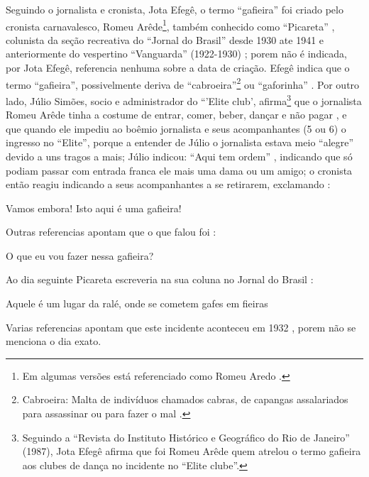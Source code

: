 Seguindo o jornalista e cronista, Jota Efegê, %
o termo ``gafieira'' foi criado pelo cronista carnavalesco, 
Romeu Arêde\footnote{Em algumas versões está  referenciado como Romeu Aredo \cite[pp. 188]{raca1999}.}, 
também conhecido como ``Picareta'' \cite[pp. 29]{instituto1987revista}\cite[pp. 3 - cad. 3]{juliosimoes} 
\cite[pp. 21]{efege1974maxixe} \cite[pp. 78]{coutinho2006cronistas}, 
colunista da seção recreativa do ``Jornal do Brasil'' desde 1930 ate 1941
e anteriormente do vespertino ``Vanguarda'' (1922-1930) \cite[pp. 58-59]{efege1982figuras} 
\cite[pp. 6 - cad. B]{entrevistajuliojournalbrasil1};
porem não é indicada, por Jota Efegê, referencia nenhuma sobre a data de criação.
Efegê indica que o termo ``gafieira'', possivelmente deriva de 
``cabroeira''\footnote{Cabroeira: Malta de indivíduos chamados cabras, 
de capangas assalariados para assassinar ou para fazer o mal \cite{diciocabroeira}.} 
ou ``gaforinha'' \cite[pp. 3 - cad. 3]{juliosimoes}.
Por outro lado, Júlio Simões, socio e administrador do ``'Elite club', 
afirma\footnote{Seguindo a ``Revista do Instituto Histórico e Geográfico do Rio de Janeiro'' (1987),
Jota Efegê afirma que foi Romeu Arêde quem atrelou o termo gafieira aos clubes de dança no incidente no ``Elite clube''.} 
que o jornalista Romeu Arêde tinha a costume de entrar, 
comer, beber, dançar e não pagar \cite[pp.13 ]{respeitojournalbrasil1},
e que quando ele impediu ao boêmio jornalista e seus acompanhantes (5 ou 6) o ingresso no ``Elite'', 
porque a entender de Júlio o jornalista estava meio ``alegre'' devido a uns tragos a mais;
 Júlio indicou: ``Aqui tem ordem'' 
\cite[pp.13 ]{respeitojournalbrasil1} \cite[pp. 6]{gafieiraaredeout2} \cite[pp. 3 - Encontro]{gafieiraaredeout1},
indicando que só podiam passar com entrada franca ele mais uma dama ou um amigo;
o cronista então reagiu indicando a seus acompanhantes a se retirarem, 
exclamando \cite[pp. 29]{instituto1987revista} \cite[pp. 6 - Tribuna Bis]{gafieiraaredeout3}: 
\begin{citando}
Vamos embora! Isto aqui é uma gafieira!
\end{citando}
Outras referencias apontam que o que falou foi \cite[pp. 6]{gafieiraaredeout2} \cite[pp. 3 - Encontro]{gafieiraaredeout1}:
\begin{citando}
O que eu vou fazer nessa gafieira?
\end{citando}
Ao dia seguinte Picareta escreveria na sua coluna no Jornal do Brasil \cite[pp. 188]{raca1999}:
\begin{citando}
Aquele é um lugar da ralé, onde se cometem gafes em fieiras
\end{citando}
Varias referencias apontam que este incidente aconteceu em 1932 \cite[pp. 3 - Encontro]{gafieiraaredeout1} \cite[pp. 188]{raca1999}, 
porem não se menciona o dia exato. 




